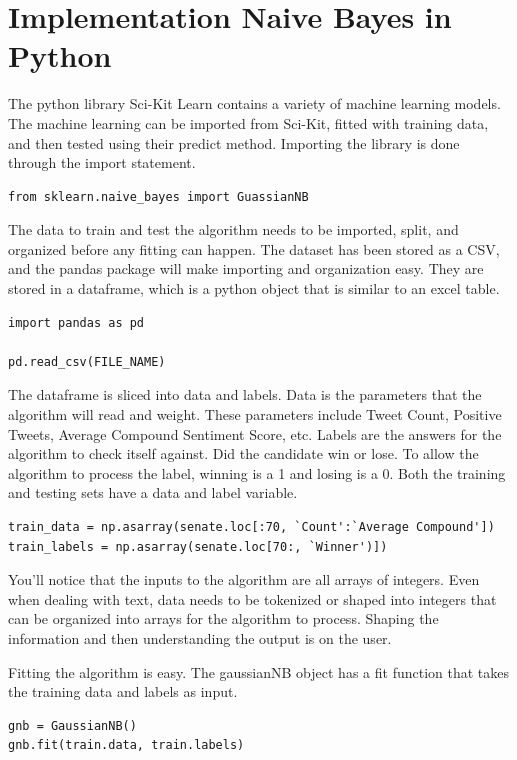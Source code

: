 \documentclass[11pt, twoside, reqno]{book}
\begin{document}
\section{Implementation Naive Bayes in Python}
\hspace{0.2in}The python library Sci-Kit Learn contains a variety of machine learning models. The machine learning can be imported from Sci-Kit, fitted with training data, and then tested using their predict method. Importing the library is done through the import statement.
\begin{verbatim}
from sklearn.naive_bayes import GuassianNB
\end{verbatim}

The data to train and test the algorithm needs to be imported, split, and organized before any fitting can happen. The dataset has been stored as a CSV, and the pandas package will make importing and organization easy. They are stored in a dataframe, which is a python object that is similar to an excel table. 
\begin{verbatim}
import pandas as pd

pd.read_csv(FILE_NAME)
\end{verbatim}

The dataframe is sliced into data and labels. Data is the parameters that the algorithm will read and weight. These parameters include Tweet Count, Positive Tweets, Average Compound Sentiment Score, etc. Labels are the answers for the algorithm to check itself against. Did the candidate win or lose. To allow the algorithm to process the label, winning is a 1 and losing is a 0. Both the training and testing sets have a data and label variable. 
\begin{verbatim}
train_data = np.asarray(senate.loc[:70, `Count':`Average Compound'])
train_labels = np.asarray(senate.loc[70:, `Winner')])
\end{verbatim}
You'll notice that the inputs to the algorithm are all arrays of integers. Even when dealing with text, data needs to be tokenized or shaped into integers that can be organized into arrays for the algorithm to process. Shaping the information and then understanding the output is on the user. 

Fitting the algorithm is easy. The gaussianNB object has a fit function that takes the training data and labels as input.
\begin{verbatim}
gnb = GaussianNB()
gnb.fit(train.data, train.labels)
\end{verbatim}
\end{document}
